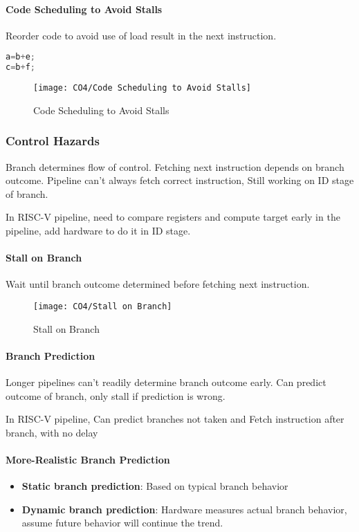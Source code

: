 \paragraph{Code Scheduling to Avoid Stalls}
Reorder code to avoid use of load result in the next instruction. 

\begin{lstlisting}[language={C}]
a=b+e;
c=b+f;
\end{lstlisting}

\begin{figure}[!htb]
    \centering
    \texttt{[image: CO4/Code Scheduling to Avoid Stalls]}
    \caption{Code Scheduling to Avoid Stalls}
\end{figure}

\subsubsection{Control Hazards}
Branch determines flow of control. Fetching next instruction depends on branch outcome. Pipeline can't always fetch correct instruction, Still working on ID stage of branch. 

In RISC-V pipeline, need to compare registers and compute target early in the pipeline, add hardware to do it in ID stage.

\paragraph{Stall on Branch}
Wait until branch outcome determined before fetching next instruction. 
\begin{figure}[!htb]
    \centering
    \texttt{[image: CO4/Stall on Branch]}
    \caption{Stall on Branch}
\end{figure}

\paragraph{Branch Prediction}
Longer pipelines can't readily determine branch outcome early. Can predict outcome of branch, only stall if prediction is wrong. 

In RISC-V pipeline, Can predict branches not taken and Fetch instruction after branch, with no delay

\paragraph{More-Realistic Branch Prediction}
\begin{itemize}
    \item \textbf{Static branch prediction}: Based on typical branch behavior
    \item \textbf{Dynamic branch prediction}: Hardware measures actual branch behavior, assume future behavior will continue the trend. 
\end{itemize}

